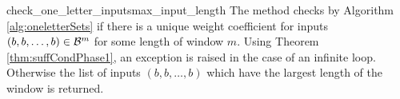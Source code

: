 \begin{method}{check\_one\_letter\_inputs}{max\_input\_length}
The method checks by Algorithm \ref{alg:oneletterSets} if there is a unique weight coefficient for inputs $({b,b,\dots,b})\in\mathcal{B}^m$ for some length of window $m$. Using Theorem \ref{thm:suffCondPhase1}, an exception is raised in the case of an infinite loop. Otherwise the list of inputs $(b,b,\dots,b)$ which have the largest length of the window is returned.
\end{method}

